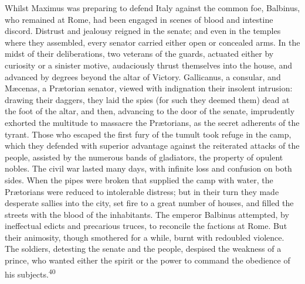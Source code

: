 Whilst Maximus was preparing to defend Italy against the common
foe, Balbinus, who remained at Rome, had been engaged in scenes
of blood and intestine discord. Distrust and jealousy reigned in
the senate; and even in the temples where they assembled, every
senator carried either open or concealed arms. In the midst of
their deliberations, two veterans of the guards, actuated either
by curiosity or a sinister motive, audaciously thrust themselves
into the house, and advanced by degrees beyond the altar of
Victory. Gallicanus, a consular, and Mæcenas, a Prætorian
senator, viewed with indignation their insolent intrusion:
drawing their daggers, they laid the spies (for such they deemed
them) dead at the foot of the altar, and then, advancing to the
door of the senate, imprudently exhorted the multitude to
massacre the Prætorians, as the secret adherents of the tyrant.
Those who escaped the first fury of the tumult took refuge in the
camp, which they defended with superior advantage against the
reiterated attacks of the people, assisted by the numerous bands
of gladiators, the property of opulent nobles. The civil war
lasted many days, with infinite loss and confusion on both sides.
When the pipes were broken that supplied the camp with water, the
Prætorians were reduced to intolerable distress; but in their
turn they made desperate sallies into the city, set fire to a
great number of houses, and filled the streets with the blood of
the inhabitants. The emperor Balbinus attempted, by ineffectual
edicts and precarious truces, to reconcile the factions at Rome.
But their animosity, though smothered for a while, burnt with
redoubled violence. The soldiers, detesting the senate and the
people, despised the weakness of a prince, who wanted either the
spirit or the power to command the obedience of his subjects.\textsuperscript{40}


